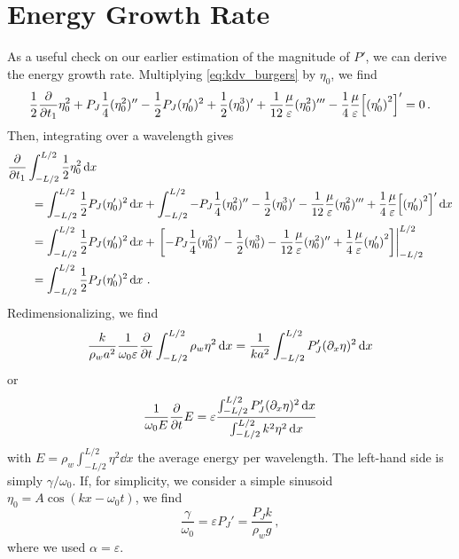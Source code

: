 \documentclass{jfm}
\renewcommand*{\epsilon}{\varepsilon}
\begin{document}
\section{Energy Growth Rate \label{sec:energy_growth_rate}}
As a useful check on our earlier estimation of the magnitude of $P'$, we
can derive the energy growth rate.
Multiplying \cref{eq:kdv_burgers} by $\eta_0$, we find
\begin{equation}
  \frac{1}{2} \pdv{t_1} \eta_0^2 + P_J
  \frac{1}{4} (\eta_0^2)'' - \frac{1}{2} P_J
  (\eta_0')^2 + \frac{1}{2} (\eta_0^3)' + \frac{1}{12}
  \frac{\mu}{\epsilon} (\eta_0^2)''' - \frac{1}{4} \frac{\mu}{\epsilon}
  \bqty{\pqty{\eta_0'}^2}' = 0 \,.
\end{equation}
Then, integrating over a wavelength gives
\begin{equation}
  \begin{split}
  &\pdv{t_1} \int_{-L/2}^{L/2} \frac{1}{2} \eta_0^2 \dd{x} \\
  &\qquad= \int_{-L/2}^{L/2} \frac{1}{2} P_J
    (\eta_0')^2 \dd{x} + \int_{-L/2}^{L/2} -P_J
    \frac{1}{4} (\eta_0^2)'' - \frac{1}{2}
    (\eta_0^3)' - \frac{1}{12} \frac{\mu}{\epsilon} (\eta_0^2)''' +
    \frac{1}{4} \frac{\mu}{\epsilon} \bqty{\pqty{\eta_0'}^2}' \dd{x}
  \\
  &\qquad=
  \int_{-L/2}^{L/2} \frac{1}{2} P_J
  (\eta_0')^2 \dd{x} + \eval{\bqty{-P_J
      \frac{1}{4} (\eta_0^2)'  - \frac{1}{2} (\eta_0^3) - \frac{1}{12}
      \frac{\mu}{\epsilon} (\eta_0^2)'' + \frac{1}{4}
      \frac{\mu}{\epsilon} \pqty{\eta_0'}^2}}_{-L/2}^{L/2}
  \\
  &\qquad=
  \int_{-L/2}^{L/2} \frac{1}{2} P_J (\eta_0')^2 \dd{x} \,.
  \end{split}
\end{equation}
Redimensionalizing, we find
\begin{equation}
  \frac{k}{\rho_w a^2} \frac{1}{\omega_0 \epsilon} \pdv{t} \int_{-L/2}^{L/2}
  \rho_w \eta^2 \dd{x} = \frac{1}{k a^2} \int_{-L/2}^{L/2} P_J'
  (\partial_x \eta)^2 \dd{x}
\end{equation}
or
\begin{equation}
  \frac{1}{\omega_0 E} \pdv{t} E =
  \epsilon
  \frac{
    \int_{-L/2}^{L/2} P_J' (\partial_x \eta)^2 \dd{x}
  }
  {
    \int_{-L/2}^{L/2} k^2 \eta^2 \dd{x}
  }
\end{equation}
with $E = \rho_w \int_{-L/2}^{L/2} \eta^2 \dd{x}$ the average
energy per wavelength.
The left-hand side is simply $\gamma/\omega_0$.
If, for simplicity, we consider a simple sinusoid $\eta_0 = A \cos(k x -
\omega_0 t)$, we find
\begin{equation}
  \frac{\gamma}{\omega_0} = \epsilon P_J' = \frac{P_J k}{\rho_w g} \,,
\end{equation}
where we used $\alpha = \epsilon$.



\end{document}
